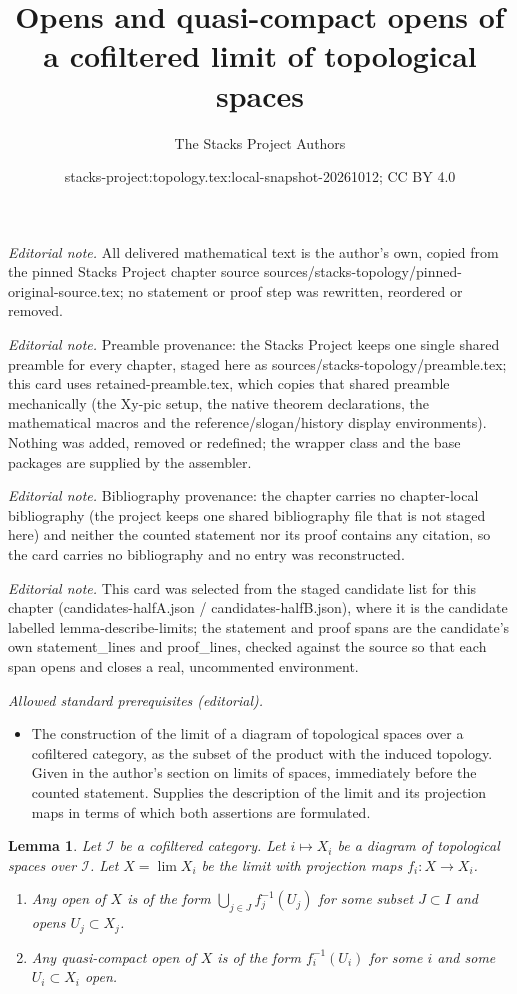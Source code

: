\documentclass[10pt,a4paper]{amsart}
\title{Opens and quasi-compact opens of a cofiltered limit of topological spaces}
\author{The Stacks Project Authors}
\date{stacks-project:topology.tex:local-snapshot-20261012; CC BY 4.0}
\theoremstyle{plain}
\newtheorem{lemma}[subsection]{Lemma}
\theoremstyle{definition}
\theoremstyle{remark}
\numberwithin{equation}{subsection}
\def\lim{\mathop{\mathrm{lim}}\nolimits}
\begin{document}
\maketitle
\noindent\textit{Editorial note.} All delivered mathematical text is the author's own, copied from the pinned Stacks Project chapter source sources/stacks-topology/pinned-original-source.tex; no statement or proof step was rewritten, reordered or removed.\par\medskip
\noindent\textit{Editorial note.} Preamble provenance: the Stacks Project keeps one single shared preamble for every chapter, staged here as sources/stacks-topology/preamble.tex; this card uses retained-preamble.tex, which copies that shared preamble mechanically (the Xy-pic setup, the native theorem declarations, the mathematical macros and the reference/slogan/history display environments). Nothing was added, removed or redefined; the wrapper class and the base packages are supplied by the assembler.\par\medskip
\noindent\textit{Editorial note.} Bibliography provenance: the chapter carries no chapter-local bibliography (the project keeps one shared bibliography file that is not staged here) and neither the counted statement nor its proof contains any citation, so the card carries no bibliography and no entry was reconstructed.\par\medskip
\noindent\textit{Editorial note.} This card was selected from the staged candidate list for this chapter (candidates-halfA.json / candidates-halfB.json), where it is the candidate labelled lemma-describe-limits; the statement and proof spans are the candidate's own statement\_lines and proof\_lines, checked against the source so that each span opens and closes a real, uncommented environment.\par\medskip
\noindent\textit{Allowed standard prerequisites (editorial).}\begin{itemize}
\item The construction of the limit of a diagram of topological spaces over a cofiltered category, as the subset of the product with the induced topology. Given in the author's section on limits of spaces, immediately before the counted statement. Supplies the description of the limit and its projection maps in terms of which both assertions are formulated.
\end{itemize}\medskip
\begin{lemma}
\label{lemma-describe-limits}
Let $\mathcal{I}$ be a cofiltered category. Let $i \mapsto X_i$ be a diagram
of topological spaces over $\mathcal{I}$. Let $X = \lim X_i$ be the limit
with projection maps $f_i : X \to X_i$.
\begin{enumerate}
\item Any open of $X$ is of the form $\bigcup_{j \in J} f_j^{-1}(U_j)$
for some subset $J \subset I$ and opens $U_j \subset X_j$.
\item Any quasi-compact open of $X$ is of the form
$f_i^{-1}(U_i)$ for some $i$ and some $U_i \subset X_i$ open.
\end{enumerate}
\end{lemma}
\end{document}
